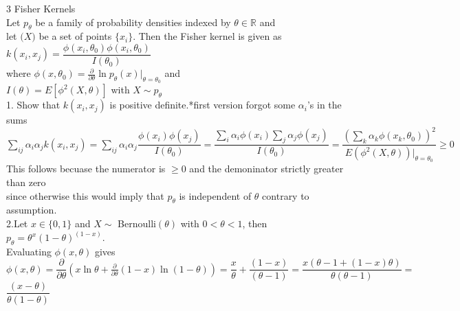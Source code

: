 \documentclass[18pt]{article}
\author{Adam Handwerger}
\begin{document}
\begin{flushleft}
3 Fisher Kernels\\
\vspace{.4cm}
Let $p_{\theta}$ be a family of probability densities indexed by $\theta \in \mathbb{R}$ and\\
let $\mathcal(X)$ be a set of points $\{x_i\}$. Then the Fisher kernel is given as\\
\vspace{.4cm}
\hspace{4cm}$k(x_i,x_j)=\dfrac{\phi(x_i,\theta_0)\phi(x_i,\theta_0)}{I(\theta_0)}$\\
\vspace{.4cm}
where $\phi(x,\theta_0)=\frac{\partial}{\partial{\theta}} \ln p_\theta(x) |_{\theta=\theta_0}$ and\\
\vspace{.4cm}
\hspace{4cm} $I(\theta)=E[\phi^2(X,\theta)]$ with $X\sim p_{\theta}$\\
\vspace{.4cm}
1. Show that $k(x_i,x_j)$ is positive definite.*first version forgot some $\alpha_i$'s in the sums\\
\vspace{.4cm}
$\sum\limits_{ij}\alpha_i\alpha_j k(x_i,x_j)=\sum\limits_{ij}\alpha_i\alpha_j \dfrac{\phi(x_i)\phi(x_j)}{I(\theta_0)}=\dfrac{\sum_i \alpha_i \phi(x_i)\sum_j \alpha_j \phi(x_j)}{I(\theta_0)}=\dfrac{\left(\sum_k \alpha_k \phi(x_k,\theta_0)\right)^2}{E(\phi^2(X,\theta))|_{\theta=\theta_0}} \geq0$\\
\vspace{.4cm}
This follows becuase the numerator is $\geq0$ and the demoninator strictly greater than zero\\
since otherwise this would imply that $p_{\theta}$ is independent of $\theta$ contrary to assumption.\\
\vspace{.4cm}
2.Let $x \in\{0,1\}$ and $X \sim$ Bernoulli$(\theta)$ with $ 0< \theta <1 $, then $p_{\theta}=\theta^{x}(1-\theta)^{(1-x)}$. \\
Evaluating $\phi(x,\theta)$ gives\\
\vspace{.4cm}
$\phi(x,\theta)=\dfrac{\partial}{\partial{\theta}}(x\ln\theta+\frac{\partial}{\partial{\theta}}(1-x)\ln(1-\theta))=\dfrac{x}{\theta}+\dfrac{(1-x)}{(\theta-1)}=\dfrac{x(\theta-1+(1-x)\theta)}{\theta(\theta-1)}=$\\
$\dfrac{(x-\theta)}{\theta(1-\theta)}$\\

\end{flushleft}
\end{document}
